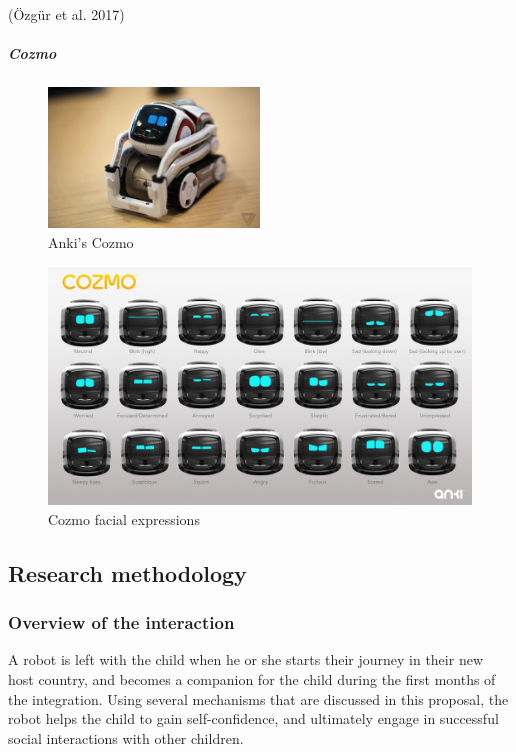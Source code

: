 \documentclass[]{article}
\let\oldsubparagraph\subparagraph
\renewcommand{\subparagraph}[1]{\oldsubparagraph{#1}\mbox{}}
\begin{document}
(Özgür et al. 2017)

\hypertarget{cozmo}{%
\subparagraph{Cozmo}\label{cozmo}}

\begin{figure}
\centering
\includegraphics[width=0.5\textwidth,height=\textheight]{figs/anki-cozmo.jpg}
\caption{Anki's Cozmo}
\end{figure}

\begin{figure}
\centering
\includegraphics{figs/cozmo-expression-sheet.jpg}
\caption{Cozmo facial expressions}
\end{figure}

\hypertarget{research-methodology}{%
\subsection{Research methodology}\label{research-methodology}}

\hypertarget{overview-of-the-interaction}{%
\subsubsection{Overview of the
interaction}\label{overview-of-the-interaction}}

A robot is left with the child when he or she starts their journey in
their new host country, and becomes a companion for the child during the
first months of the integration. Using several mechanisms that are
discussed in this proposal, the robot helps the child to gain
self-confidence, and ultimately engage in successful social interactions
with other children.
\end{document}
